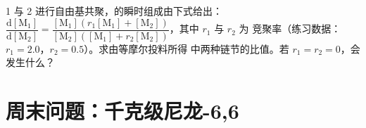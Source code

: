 \begin{exercise}[$\star\star\star$]\label{exo:b2:polymer-synthesis:12}
 1 与 2 进行自由基共聚，的瞬时组成由下式给出：
$\dfrac{\mathrm d[\mathrm M_1]}{\mathrm d[\mathrm M_2]} = \dfrac{[\mathrm M_1](r_1[\mathrm M_1]
+ [\mathrm M_2])}{[\mathrm M_2]([\mathrm M_1] + r_2[\mathrm M_2])}$，其中 $r_1$ 与 $r_2$ 为
竞聚率（练习数据：$r_1 = 2.0$，$r_2 = 0.5$）。求由等摩尔投料所得
中两种链节的比值。若 $r_1 = r_2 = 0$，会发生什么？
\end{exercise}

\section{周末问题：千克级尼龙-6,6}

